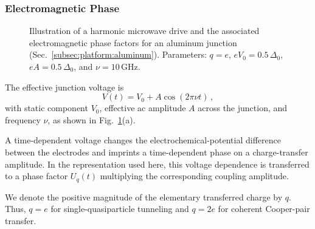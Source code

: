         \subsubsection*{Electromagnetic Phase}

            \begin{figure}[t]
                \centering
                \hfill
                \hfill
                \hfill
                \caption{Illustration of a harmonic microwave drive and the associated electromagnetic phase factors for an aluminum junction (Sec.~\ref{subsec:platform:aluminum}).
                Parameters: $q=e$, $eV_0 = 0.5\,\Delta_0$, $eA = 0.5\,\Delta_0$, and $\nu=10\,\mathrm{GHz}$.}
                \label{fig:platform:microwave}
            \end{figure}

            The effective junction voltage is
            \begin{equation}
                V(t) = V_0 + A \cos (2\pi\nu t)\,,
                \label{eq:platform:drive-voltage}
            \end{equation}
            with static component $V_0$, effective ac amplitude $A$ across the junction, and frequency $\nu$, as shown in Fig.~\ref{fig:platform:microwave}(a).
        
            A time-dependent voltage changes the electrochemical-potential difference between the electrodes and imprints a time-dependent phase on a charge-transfer amplitude. In the representation used here, this voltage dependence is transferred to a phase factor $U_q(t)$ multiplying the corresponding coupling amplitude.

            We denote the positive magnitude of the elementary transferred charge by $q$. Thus, $q=e$ for single-quasiparticle tunneling and $q=2e$ for coherent Cooper-pair transfer.

